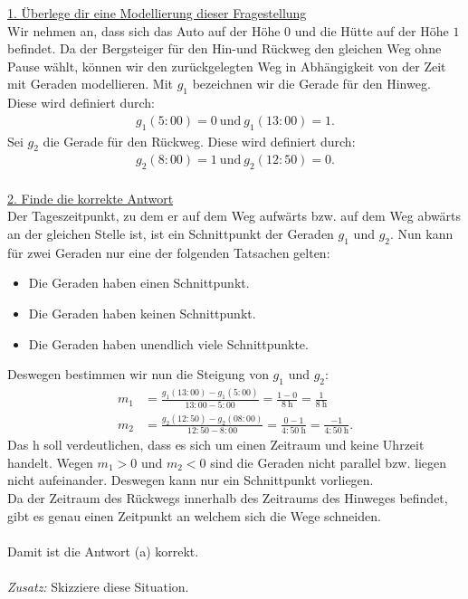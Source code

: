\underline{1. Überlege dir eine Modellierung dieser Fragestellung}\\
Wir nehmen an, dass sich das Auto auf der Höhe $ 0 $ und die Hütte auf der Höhe $ 1 $ befindet. Da der Bergsteiger für den Hin-und Rückweg den gleichen Weg ohne Pause wählt, können wir den zurückgelegten Weg in Abhängigkeit von der Zeit mit Geraden modellieren.
Mit $ g_1 $ bezeichnen wir die Gerade für den Hinweg. Diese wird definiert durch:
\begin{align*}
	g_1(5\mathrm{:}00) = 0 \ \textrm{und} \ g_1(13\mathrm{:}00) = 1. 
\end{align*}
Sei $ g_2 $ die Gerade für den Rückweg. Diese wird definiert durch:
\begin{align*}
	g_2(8\mathrm{:}00) = 1 \ \textrm{und} \ g_2(12\mathrm{:}50) = 0.
\end{align*}
\ \\
\underline{2. Finde die korrekte Antwort}\\
Der Tageszeitpunkt, zu dem er auf dem Weg aufwärts bzw. auf dem Weg abwärts an der gleichen Stelle ist, ist ein Schnittpunkt der Geraden $ g_1 $ und $ g_2 $.
Nun kann für zwei Geraden nur eine der folgenden Tatsachen gelten:
\begin{itemize}
	\item Die Geraden haben einen Schnittpunkt.
	\item Die Geraden haben keinen Schnittpunkt.
	\item Die Geraden haben unendlich viele Schnittpunkte.
\end{itemize}
Deswegen bestimmen wir nun die Steigung von $ g_1 $ und $ g_2 $:
\begin{align*}
	m_1 &= \frac{g_1(13\mathrm{:}00) - g_1(5\mathrm{:}00)}{13\mathrm{:}00 - 5\mathrm{:}00}
	=
	\frac{1 - 0}{8\ \mathrm{h}} = \frac{1}{8\ \mathrm{h}}\\
	m_2 &= \frac{g_2(12\mathrm{:}50) - g_2(08\mathrm{:}00)}{12\mathrm{:}50 - 8\mathrm{:}00}
	=
	\frac{0 - 1}{4\mathrm{:}50 \ \mathrm{h}}
	=
	\frac{- 1}{4\mathrm{:}50 \ \mathrm{h}}.
\end{align*}
Das $ \mathrm{h} $ soll verdeutlichen, dass es sich um einen Zeitraum und keine Uhrzeit handelt. Wegen $ m_1 > 0 $ und $ m_2 < 0 $ sind die Geraden nicht parallel bzw. liegen nicht aufeinander. Deswegen kann nur ein Schnittpunkt vorliegen.\\
Da der Zeitraum des Rückwegs innerhalb des Zeitraums des Hinweges befindet, gibt es genau einen Zeitpunkt an welchem sich die Wege schneiden.\\
\\
Damit ist die Antwort (a) korrekt.\\
\\
\textit{Zusatz: } Skizziere diese Situation.


